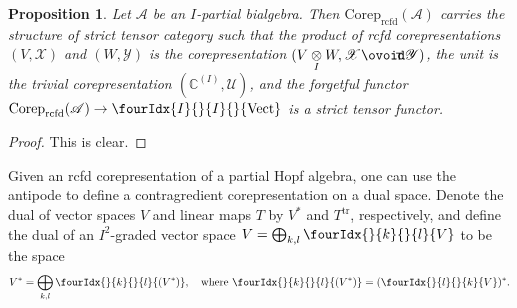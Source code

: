 \documentclass[10pt]{article}
\DeclareMathOperator{\rcf}{\mathrm{rcfd}}
\DeclareMathOperator{\tr}{\mathrm{tr}}
\newcommand{\dual}[1]{#1^{*}}
\newcommand{\dualop}[1]{#1^{\tr}}
\newcommand{\Corep}{\mathrm{Corep}}
\newcommand{\Circt}{{\mathop{\ooalign{$\ovoid$\cr\hidewidth\raise-.05ex\hbox{$\scriptstyle\mathsf T\mkern3.5mu$}\cr}}}} %
\newcommand{\C}{\mathbb{C}}
\newcommand{\Vecti}{\Grd{\mathrm{Vect}}{I}{I}}
\newcommand{\itimes}{\underset{I}{\otimes}}
\newcommand{\Gr}[5]{\fourIdx{#2}{#4}{#3}{#5}{#1}}%
\newcommand{\Gru}[3]{\Gr{#1}{}{}{#2}{#3}}
\newcommand{\Grd}[3]{\Gr{#1}{#2}{#3}{}{}}
\newtheorem{Prop}[Theorem]{Proposition}
\theoremstyle{definition}
\numberwithin{equation}{section}
\begin{document}
\begin{Prop} \label{prop:rep-tensor} Let $\mathscr{A}$ be an
  $I$-partial bialgebra. Then  $\Corep_{\rcf}(\mathscr{A})$ carries the
  structure of strict tensor category such that the product of rcfd corepresentations $(V,\mathscr{X})$ and
  $(W,\mathscr{Y})$ is the corepresentation $(V\itimes
  W,\mathscr{X}\Circt \mathscr{Y})$, the unit is the trivial
  corepresentation $(\C^{(I)},\mathscr{U})$, and the forgetful functor
  $\Corep_{\rcf}(\mathscr{A}) \to \Vecti$ is a strict tensor functor.
\end{Prop}
\begin{proof}
This is clear.
\end{proof}

Given an rcfd corepresentation of a partial Hopf algebra, one can use the
antipode to define a contragredient corepresentation on a dual space.
Denote the dual of vector spaces $V$ and  linear maps $T$ by
$\dual{V}$ and $\dualop{T}$, respectively, and define the dual of an
$I^{2}$-graded vector space $V=\bigoplus_{k,l} \Gru{V}{k}{l}$ to be
the space
\begin{align*}
  \dual{V}=\bigoplus_{k,l} \Gru{(\dual{V})}{k}{l}, \quad \text{where }
\Gru{(\dual{V})}{k}{l} = \dual{(\Gru{V}{l}{k})}.
\end{align*}
\end{document}
